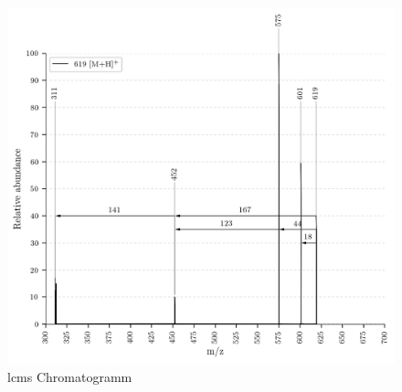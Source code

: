 \begin{figure}[!htbp]
  \centering
  \includegraphics[width=\textwidth, height=0.7\textwidth]{figures/Kapitel7/Kataboliten/VWA_MS_619.png}
  \caption[LC-MS Chromatogramm vor der Reaktion, Quelle: Author]{\gls{lcms} Chromatogramm}
  \label{fig:LCMSChromatogramm}
\end{figure}

